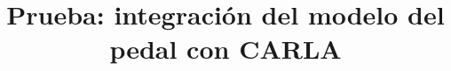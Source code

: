 \documentclass[conference]{IEEEtran}
\begin{document}
\title{Prueba: integración del modelo del pedal con CARLA}
\maketitle


\end{document}
